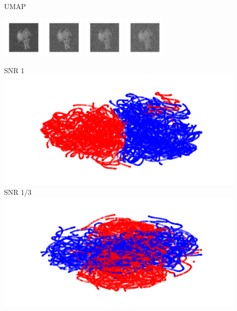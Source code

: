 \documentclass[t, 11pt, xcolor=dvipsnames]{beamer}
\begin{document}
\begin{frame}[fragile]{UMAP} 
	\begin{center}
          \vspace{-1em}
            \includegraphics[width=0.15\textwidth]{images/projSNR1.png}
            \includegraphics[width=0.15\textwidth]{images/projSNR1_2.png}
            \includegraphics[width=0.15\textwidth]{images/projSNR1_3.png}
            \includegraphics[width=0.15\textwidth]{images/projSNR1_4.png}
		  \begin{minipage}{0.47\textwidth}
	          SNR 1\\
                  \includegraphics[width=0.9\textwidth]{images/dimredcomps/UMAP_gt_snr1.png}\\
		  SNR 1/3\\
                  \includegraphics[width=0.9\textwidth]{images/dimredcomps/UMAP_gt_snr1_3.png}\\

\end{minipage}
\end{center}
\end{frame}
\end{document}
